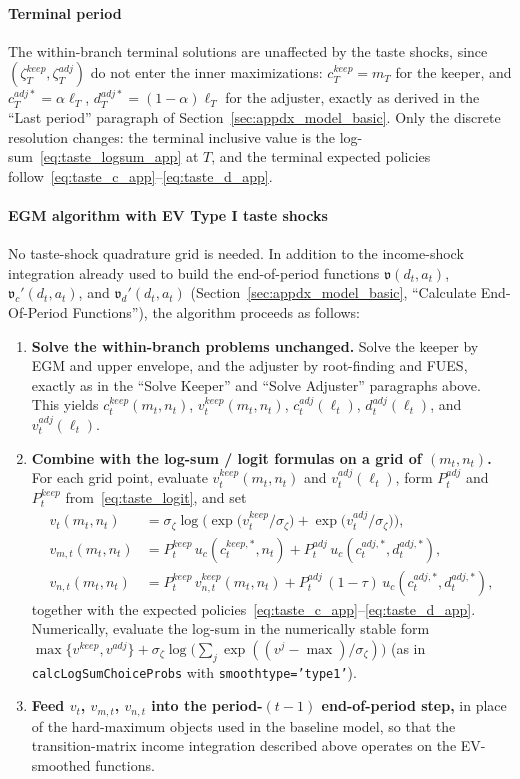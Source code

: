 \paragraph{Terminal period}
The within-branch terminal solutions are unaffected by the taste shocks, since $(\zeta_T^{keep},\zeta_T^{adj})$ do not enter the inner maximizations: $c_T^{keep}=m_T$ for the keeper, and $c_T^{adj\ast}=\alpha \ell_T$, $d_T^{adj\ast}=(1-\alpha)\ell_T$ for the adjuster, exactly as derived in the ``Last period'' paragraph of Section~\ref{sec:appdx_model_basic}. Only the discrete resolution changes: the terminal inclusive value is the log-sum~\eqref{eq:taste_logsum_app} at $T$, and the terminal expected policies follow~\eqref{eq:taste_c_app}--\eqref{eq:taste_d_app}.

\paragraph{EGM algorithm with EV Type I taste shocks}
No taste-shock quadrature grid is needed. In addition to the income-shock integration already used to build the end-of-period functions $\mathfrak{v}(d_t,a_t)$, $\mathfrak{v}_c'(d_t,a_t)$, and $\mathfrak{v}_d'(d_t,a_t)$ (Section~\ref{sec:appdx_model_basic}, ``Calculate End-Of-Period Functions''), the algorithm proceeds as follows:
\begin{enumerate}
	\item \textbf{Solve the within-branch problems unchanged.} Solve the keeper by EGM and upper envelope, and the adjuster by root-finding and FUES, exactly as in the ``Solve Keeper'' and ``Solve Adjuster'' paragraphs above. This yields $c_{t}^{keep}(m_t,n_t)$, $v_t^{keep}(m_t,n_t)$, $c_t^{adj}(\ell_t)$, $d_t^{adj}(\ell_t)$, and $v_t^{adj}(\ell_t)$.
	\item \textbf{Combine with the log-sum / logit formulas on a grid of $(m_t,n_t)$.} For each grid point, evaluate $v_t^{keep}(m_t,n_t)$ and $v_t^{adj}(\ell_t)$, form $P_t^{adj}$ and $P_t^{keep}$ from~\eqref{eq:taste_logit}, and set
	\begin{align}
		v_t(m_t,n_t) &= \sigma_\zeta \log\Big(
			\exp\big(v_t^{keep}/\sigma_\zeta\big)
			+ \exp\big(v_t^{adj}/\sigma_\zeta\big)
		\Big), \\
		v_{m,t}(m_t,n_t) &= P_t^{keep}\, u_c(c_t^{keep,\ast},n_t) + P_t^{adj}\, u_c(c_t^{adj,\ast},d_t^{adj,\ast}), \\
		v_{n,t}(m_t,n_t) &= P_t^{keep}\, v_{n,t}^{keep}(m_t,n_t) + P_t^{adj}\,(1-\tau)\, u_c(c_t^{adj,\ast},d_t^{adj,\ast}),
	\end{align}
	together with the expected policies~\eqref{eq:taste_c_app}--\eqref{eq:taste_d_app}. Numerically, evaluate the log-sum in the numerically stable form $\max\{v^{keep},v^{adj}\}+\sigma_\zeta\log\big(\sum_j \exp((v^j-\max)/\sigma_\zeta)\big)$ (as in \texttt{calcLogSumChoiceProbs} with \texttt{smoothtype='type1'}).
	\item \textbf{Feed $v_t$, $v_{m,t}$, $v_{n,t}$ into the period-$(t-1)$ end-of-period step,} in place of the hard-maximum objects used in the baseline model, so that the transition-matrix income integration described above operates on the EV-smoothed functions.
\end{enumerate}
